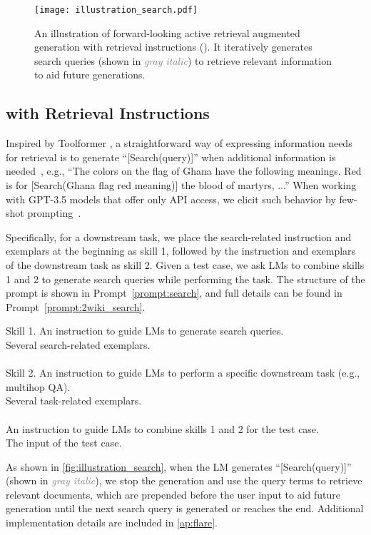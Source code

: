 \begin{figure}[tb]
\texttt{[image: illustration\_search.pdf]}
\centering
\caption{An illustration of forward-looking active retrieval augmented generation with retrieval instructions (\oursr). It iteratively generates search queries (shown in \textcolor{gray}{\textit{gray italic}}) to retrieve relevant information to aid future generations.}
\label{fig:illustration_search}
\end{figure}

\subsection{\ours with Retrieval Instructions}
Inspired by Toolformer \cite{toolformer-schick-2023}, a straightforward way of expressing information needs for retrieval is to generate ``[Search(query)]'' when additional information is needed~\cite{toolformer-schick-2023}, e.g., ``The colors on the flag of Ghana have the following meanings. Red is for [Search(Ghana flag red meaning)] the blood of martyrs, ...''
When working with GPT-3.5 models that offer only API access, we elicit such behavior by few-shot prompting~\cite{gpt3-brown-2020}.

Specifically, for a downstream task, we place the search-related instruction and exemplars at the beginning as skill 1, followed by the instruction and exemplars of the downstream task as skill 2.
Given a test case, we ask LMs to combine skills 1 and 2 to generate search queries while performing the task.
The structure of the prompt is shown in Prompt~\autoref{prompt:search}, and full details can be found in Prompt~\autoref{prompt:2wiki_search}.
\begin{prompt}[title={Prompt \thetcbcounter: retrieval instructions}, label=prompt:search]
Skill 1. An instruction to guide LMs to generate search queries.\\
Several search-related exemplars.\\
\\
Skill 2. An instruction to guide LMs to perform a specific downstream task (e.g., multihop QA).\\
Several task-related exemplars.\\
\\
An instruction to guide LMs to combine skills 1 and 2 for the test case.\\
The input of the test case.
\end{prompt}
As shown in \autoref{fig:illustration_search}, when the LM generates ``[Search(query)]'' (shown in \textcolor{gray}{\textit{gray italic}}), we stop the generation and use the query terms to retrieve relevant documents, which are prepended before the user input to aid future generation until the next search query is generated or reaches the end.
Additional implementation details are included in \autoref{ap:flare}.

